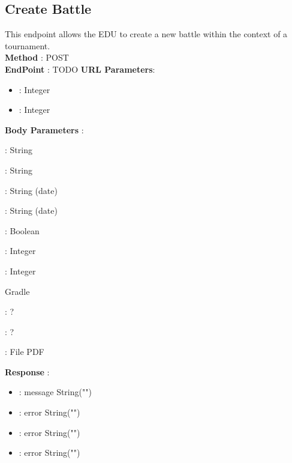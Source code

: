 \subsection*{Create Battle}
This endpoint allows the EDU to create a new battle within the context of a tournament.\\
\textbf{Method} : POST \\
\textbf{EndPoint} : {\color{blue} TODO}
\textbf{URL Parameters}:
\begin{itemize}
    \item {} : Integer
    \item {} : Integer
\end{itemize}
\textbf{Body Parameters} :
\begin{itemize}
    \item {} : String
    \item {} : String
    \item {} : String (date)
    \item {} : String (date)
    \item {} : Boolean
    \item {} : Integer
    \item {} : Integer
    
    {\color{red}
    Gradle
    \item {} : ?
    \item {} : ?
    \item {} : File PDF
    }
    
\end{itemize}
\textbf{Response} :
\begin{itemize}
    \item {} : message String("")
    \item {} : error String("")
    \item {} : error String("")
    \item {} : error String("")
\end{itemize}

